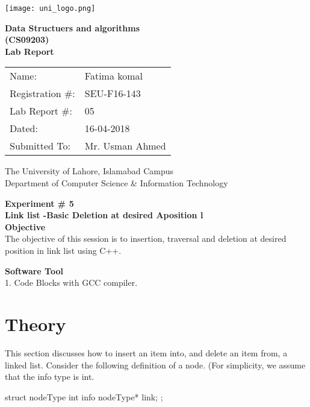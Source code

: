 \documentclass[11pt]{article}            %
\begin{document}
\begin{titlepage}
    \centering
  \vfill
    \texttt{[image: uni\_logo.png]} \\ 
	\vskip2cm
    {\bfseries\Large
	Data Structuers and algorithms \\ (CS09203)\\
	
	\vskip2cm
	Lab Report 
	 
	\vskip2cm
	}    

\begin{center}
\begin{tabular}{ l l  } 

Name: & Fatima komal \\ 
Registration \#: & SEU-F16-143 \\ 
Lab Report \#: & 05 \\ 
 Dated:& 16-04-2018\\ 
Submitted To:& Mr. Usman Ahmed\\ 

\end{tabular}
\end{center}
    \vfill
    The University of Lahore, Islamabad Campus\\
Department of Computer Science \& Information Technology
\end{titlepage}


    
    {\bfseries\Large
\centering
	Experiment \# 5 \\

Link list -Basic Deletion at desired  Aposition l \\
	
	}    
 \vskip1cm
 \textbf {Objective}\\ The objective of this session is to insertion, traversal and deletion at desired position in link list 
using C++. 
 
 \textbf {Software Tool} \\
 1. Code Blocks with GCC compiler.

\section{Theory }              

This section discusses how to insert an item into, and delete an item from, a linked list. 
Consider the following definition of a node. (For simplicity, we assume that the info type is int. 
 
  struct nodeType 
 {  
int info nodeType* link; 
  }; 
\end{document}
